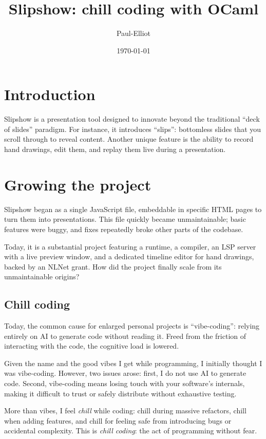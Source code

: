 \documentclass[10pt,a4paper]{article}
\title{Slipshow: chill coding with OCaml}
\author{Paul-Elliot}
\date{\today}
\begin{document}
\maketitle

\section{Introduction}

Slipshow is a presentation tool designed to innovate beyond the traditional
``deck of slides'' paradigm. For instance, it introduces ``slips'': bottomless
slides that you scroll through to reveal content. Another unique feature is the
ability to record hand drawings, edit them, and replay them live during a
presentation.

\section{Growing the project}

Slipshow began as a single JavaScript file, embeddable in specific HTML pages to
turn them into presentations. This file quickly became unmaintainable; basic
features were buggy, and fixes repeatedly broke other parts of the codebase.

Today, it is a substantial project featuring a runtime, a compiler, an LSP
server with a live preview window, and a dedicated timeline editor for hand
drawings, backed by an NLNet grant. How did the project finally scale from its
unmaintainable origins?

\subsection{Chill coding}

Today, the common cause for enlarged personal projects is ``vibe-coding'':
relying entirely on AI to generate code without reading it. Freed from the
friction of interacting with the code, the cognitive load is lowered.

Given the name and the good vibes I get while programming, I initially thought I
was vibe-coding. However, two issues arose: first, I do not use AI to generate
code. Second, vibe-coding means losing touch with your software's internals,
making it difficult to trust or safely distribute without exhaustive testing.

More than vibes, I feel \emph{chill} while coding: chill during massive
refactors, chill when adding features, and chill for feeling safe from
introducing bugs or accidental complexity. This is \emph{chill coding}: the act
of programming without fear.
\end{document}
